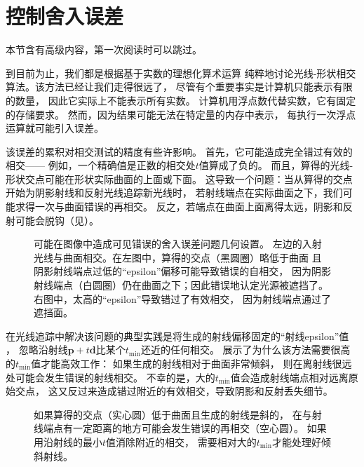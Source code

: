 \section{控制舍入误差}\label{sec:控制舍入误差}

\begin{remark}
    本节含有高级内容，第一次阅读时可以跳过。
\end{remark}

到目前为止，我们都是根据基于实数的理想化算术运算
纯粹地讨论光线-形状相交算法。该方法已经让我们走得很远了，
尽管有个重要事实是计算机只能表示有限的数量，
因此它实际上不能表示所有实数。
计算机用浮点数代替实数，它有固定的存储要求。
然而，因为结果可能无法在特定量的内存中表示，
每执行一次浮点运算就可能引入误差。

该误差的累积对相交测试的精度有些许影响。
首先，它可能造成完全错过有效的相交——
例如，一个精确值是正数的相交处$t$值算成了负的。
而且，算得的光线-形状交点可能在形状实际曲面的上面或下面。
这导致一个问题：当从算得的交点开始为阴影射线和反射光线追踪新光线时，
若射线端点在实际曲面之下，我们可能求得一次与曲面错误的再相交。
反之，若端点在曲面上面离得太远，阴影和反射可能会脱钩（见）。
\begin{figure}[htbp]
    \centering
    \caption{可能在图像中造成可见错误的舍入误差问题几何设置。
        左边的入射光线与曲面相交。在左图中，算得的交点（黑圆圈）略低于曲面
        且阴影射线端点过低的“epsilon”偏移可能导致错误的自相交，
        因为阴影射线端点（白圆圈）仍在曲面之下；因此错误地认定光源被遮挡了。
        右图中，太高的“epsilon”导致错过了有效相交，
        因为射线端点通过了遮挡面。}
    \label{fig:3.39}
\end{figure}

在光线追踪中解决该问题的典型实践是将生成的射线偏移固定的“射线epsilon”值
，
忽略沿射线$\bm p+t\bm d$比某个$t_{\min}$还近的任何相交。
展示了为什么该方法需要很高的$t_{\min}$值才能高效工作：
如果生成的射线相对于曲面非常倾斜，
则在离射线很远处可能会发生错误的射线相交。
不幸的是，大的$t_{\min}$值会造成射线端点相对远离原始交点，
这又反过来造成错过附近的有效相交，导致阴影和反射丢失细节。
\begin{figure}[htbp]
    \centering
    \caption{如果算得的交点（实心圆）低于曲面且生成的射线是斜的，
        在与射线端点有一定距离的地方可能会发生错误的再相交（空心圆）。
        如果用沿射线的最小$t$值消除附近的相交，
        需要相对大的$t_{\min}$才能处理好倾斜射线。}
    \label{fig:3.40}
\end{figure}

